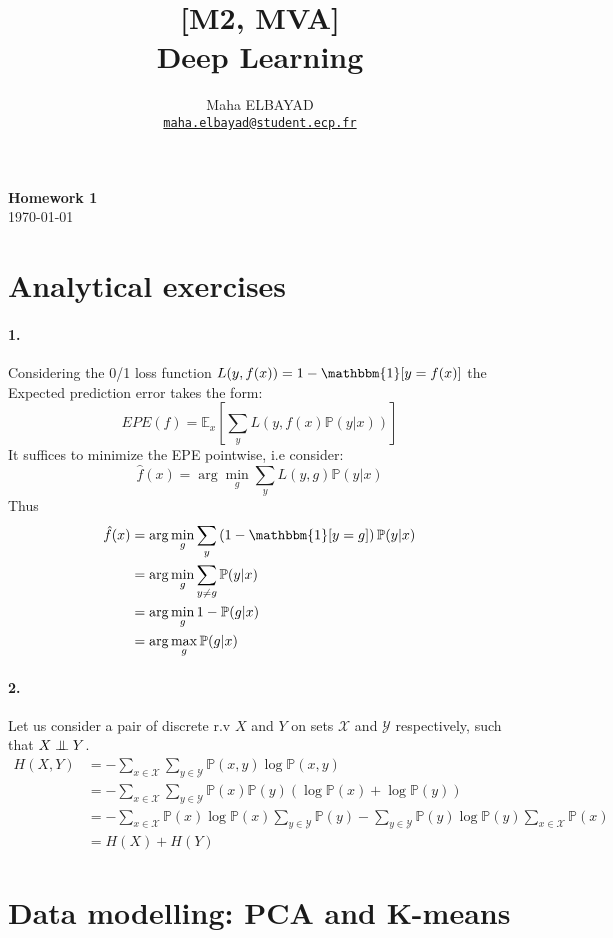 \documentclass[11pt]{article}
\title{[M2, MVA]\\ Deep Learning}
\author{Maha ELBAYAD\\ \href{mailto:maha.elbayad@student.ecp.fr}{\tt maha.elbayad@student.ecp.fr}}
\date{}
\theoremstyle{exo}
\newcommand{\p}{\mathbb{P}}
\newcommand{\1}{\mathbbm{1}}
\newcommand{\X}{\mathcal{X}}
\newcommand{\Y}{\mathcal{Y}}
\newcommand{\indep}{\mathrel{\perp\mspace{-10mu}\perp}}
\begin{document}
\maketitle
\vspace{-10pt}
\begin{center}
{\huge \bf Homework 1}\\
\today
\vspace{10pt}
\end{center}

\vspace{7pt}

\section{Analytical exercises}
	\paragraph{1.}
		Considering the 0/1 loss function $L(y,f(x))=1-\1[y=f(x)]$ the Expected prediction error takes the form:
		\[EPE(f)=\mathbb E_x\left[\sum_yL(y,f(x)\p(y|x))\right]\]
		It suffices to minimize the EPE pointwise, i.e consider:
		\[\hat f(x)=\arg\min_g\sum_yL(y,g)\p(y|x)\]
		Thus
		\[\begin{split}
		\hat f(x)&=\arg\min_g\sum_y\left(1-\1[y=g]\right)\p(y|x)\\
		&=\arg\min_g\sum_{y\neq g}\p(y|x)\\
		&=\arg\min_g 1-\p(g|x)\\
		&=\arg\max_g \p(g|x)
		\end{split}\]
	\paragraph{2.}
		Let us consider a pair of discrete r.v $X$ and $Y$ on sets $\X$ and $\Y$ respectively, such that $X\indep Y$.
		\[\begin{split}
		H(X,Y)&=-\sum_{x\in \X}\sum_{y\in \Y}\p(x,y)\log\p(x,y)\\
		&=-\sum_{x\in \X}\sum_{y\in \Y}\p(x)\p(y)(\log\p(x)+\log\p(y))\\
		&=-\sum_{x\in \X}\p(x)\log\p(x)\sum_{y\in \Y}\p(y)-\sum_{y\in \Y}\p(y)\log\p(y)\sum_{x\in \X}\p(x)\\
		&=H(X)+H(Y)
		\end{split}\]

\section{Data modelling: PCA and K-means}
\end{document}
